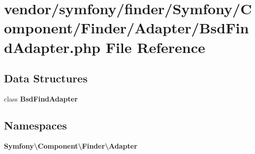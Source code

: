 \section{vendor/symfony/finder/\+Symfony/\+Component/\+Finder/\+Adapter/\+Bsd\+Find\+Adapter.php File Reference}
\label{_bsd_find_adapter_8php}
\subsection*{Data Structures}
\begin{DoxyCompactItemize}
\item 
class {\bf Bsd\+Find\+Adapter}
\end{DoxyCompactItemize}
\subsection*{Namespaces}
\begin{DoxyCompactItemize}
\item 
 {\bf Symfony\textbackslash{}\+Component\textbackslash{}\+Finder\textbackslash{}\+Adapter}
\end{DoxyCompactItemize}
